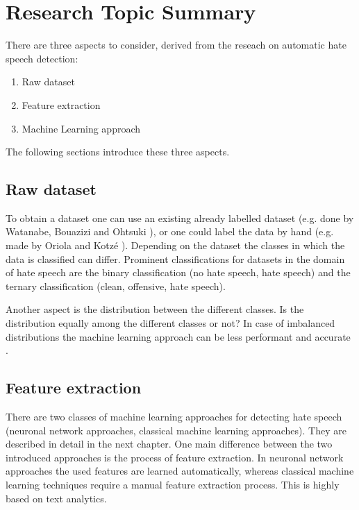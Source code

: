 \section{Research Topic Summary}

There are three aspects to consider, derived from the reseach on automatic hate speech detection:
\begin{enumerate}
	\item Raw dataset
	\item Feature extraction
	\item Machine Learning approach
\end{enumerate}

\noindent
The following sections introduce these three aspects.

\subsection{Raw dataset}
To obtain a dataset one can use an existing already labelled dataset (e.g. done by Watanabe, Bouazizi and Ohtsuki \cite{Watanabe.2018}), or one could label the data by hand (e.g. made by Oriola and Kotz\'{e} \cite{Oriola.2020}).
Depending on the dataset the classes in which the data is classified can differ. Prominent classifications for datasets in the domain of hate speech are the binary classification (no hate speech, hate speech) and the ternary classification (clean, offensive, hate speech). 

Another aspect is the distribution between the different classes. Is the distribution equally among the different classes or not? In case of imbalanced distributions the machine learning approach can be less performant and accurate \cite{Oriola.2020}.


\subsection{Feature extraction}
There are two classes of machine learning approaches for detecting hate speech (neuronal network approaches, classical machine learning approaches). They are described in detail in the next chapter. One main difference between the two introduced approaches is the process of feature extraction. In neuronal network approaches the used features are learned automatically, whereas classical machine learning techniques require a manual feature ex\-trac\-tion process. This is highly based on text analytics.

